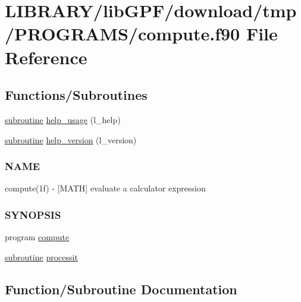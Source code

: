 \hypertarget{compute_8f90}{}\section{L\+I\+B\+R\+A\+R\+Y/lib\+G\+P\+F/download/tmp/\+P\+R\+O\+G\+R\+A\+M\+S/compute.f90 File Reference}
\label{compute_8f90}
\subsection*{Functions/\+Subroutines}
\begin{DoxyCompactItemize}
\item 
\hyperlink{M__stopwatch_83_8txt_acfbcff50169d691ff02d4a123ed70482}{subroutine} \hyperlink{compute_8f90_a3e09a3b52ee8fb04eeb93fe5761626a8}{help\+\_\+usage} (l\+\_\+help)
\item 
\hyperlink{M__stopwatch_83_8txt_acfbcff50169d691ff02d4a123ed70482}{subroutine} \hyperlink{compute_8f90_a39c21619b08a3c22f19e2306efd7f766}{help\+\_\+version} (l\+\_\+version)
\begin{DoxyCompactList}\small\item\em \subsubsection*{N\+A\+ME}

compute(1f) -\/ \mbox{[}M\+A\+TH\mbox{]} evaluate a calculator expression \subsubsection*{S\+Y\+N\+O\+P\+S\+IS}\end{DoxyCompactList}\item 
program \hyperlink{compute_8f90_ad31daef7ea6df41611fcaae1171ce54a}{compute}
\item 
\hyperlink{M__stopwatch_83_8txt_acfbcff50169d691ff02d4a123ed70482}{subroutine} \hyperlink{compute_8f90_a6b077f312d27a28f21803c6d624132b7}{processit}
\end{DoxyCompactItemize}


\subsection{Function/\+Subroutine Documentation}
\mbox{\label{compute_8f90_ad31daef7ea6df41611fcaae1171ce54a}} 

